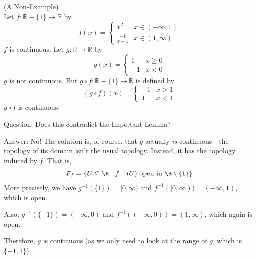 \begin{example} (A Non-Example)\\
 Let $f: \mathbb{R}-\{1\} \rightarrow \mathbb{R}$ by
\[ f(x) = \begin{cases} x^2 & x\in(-\infty, 1) \\ \frac{-1}{x-1} & x\in (1, \infty) \end{cases} \]
$f$ is continuous. Let $g: \mathbb{R} \rightarrow \mathbb{R}$ by
\[ g(x) = \begin{cases}  1 &  x\ge 0 \\  -1 & x < 0 \end{cases} \]
$g$ is not continuous. But $g \circ f: \mathbb{R}-\{1\} \rightarrow \mathbb{R}$ is defined by
\[ (g\circ f)(x) = \begin{cases} -1 & x > 1 \\ 1 & x < 1 \end{cases} \]
$g \circ f$ is continuous.
\end{example} 
Question: Does this contradict the Important Lemma?

Answer: No!  The solution is, of course, that $g$ actually \emph{is} continuous - the topology of its domain isn't the usual topology.  Instead, it has the topology induced by $f$.  That is, 
\[F_f = \{ U\subseteq \R : f^{-1}(U)\text{ open in }\R\setminus\{1\} \}\]
More precisely, we have $g^{-1}(\{ 1\}) = [0, \infty)$ and $f^{-1}([0, \infty)) = (-\infty,1)$, which is open.

Also, $g^{-1}( \{-1 \} ) = (-\infty,0)$ and $f^{-1}((-\infty, 0)) = (1, \infty)$, which again is open.

Therefore, $g$ is continuous (as we only need to look at the range of $g$, which is $\{-1, 1\}$).

